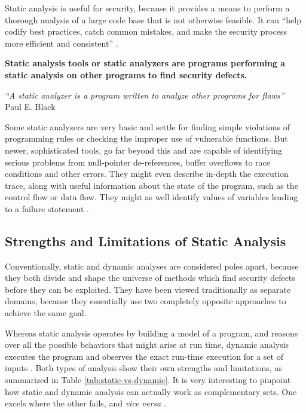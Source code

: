 Static analysis is useful for security, because it provides a means to perform a thorough analysis of a large code base that is not otherwise feasible. It can ``help codify best practices, catch common mistakes, and make the security process more efficient and consistent'' \cite{chess2007secure}.

\clearpage

\textbf{Static analysis tools or static analyzers are programs performing a static analysis on other programs to find security defects.}

\begin{flushright}
    \emph{``A static analyzer is a program written to analyze other programs for flaws''\\}
    \cite{black2009static} Paul E. Black
\end{flushright}

 Some static analyzers are very basic and settle for finding simple violations of programming rules or checking the improper use of vulnerable functions. But newer, sophisticated tools, go far beyond this and are capable of identifying serious problems from null-pointer de-references, buffer overflows to race conditions and other errors. They might even describe in-depth the execution trace, along with useful information about the state of the program, such as the control flow or data flow. They might as well identify values of variables leading to a failure statement \cite{anderson2008use, black2009static}.

\subsection{Strengths and Limitations of Static Analysis}

Conventionally, static and dynamic analyses are considered poles apart, because they both divide and shape the universe of methods which find security defects before they can be exploited. They have been viewed traditionally as separate domains, because they essentially use two completely opposite approaches to achieve the same goal.

Whereas static analysis operates by building a model of a program, and reasons over all the possible behaviors that might arise at run time, dynamic analysis executes the program and observes the exact run-time execution for a set of inputs \cite{ernst2003static}. Both types of analysis show their own strengths and limitations, as summarized in Table \ref{tab:static-vs-dynamic}. It is very interesting to pinpoint how static and dynamic analysis can actually work as complementary sets. One excels where the other fails, and \emph{vice versa} \cite{ernst2003static}.

